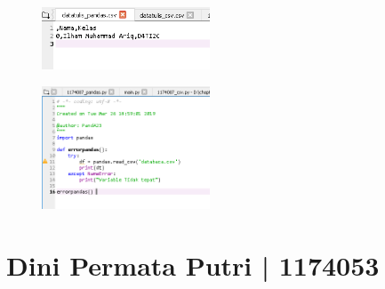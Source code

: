 \begin{figure}[H]
 \includegraphics[width=5cm]{figures/4/1174087/Praktek/datatulis_pandas.png}
 \centering
\end{figure}

\begin{figure}[H]
 \includegraphics[width=5cm]{figures/4/1174087/Praktek/error.png}
 \centering
\end{figure}

\section{Dini Permata Putri | 1174053}
